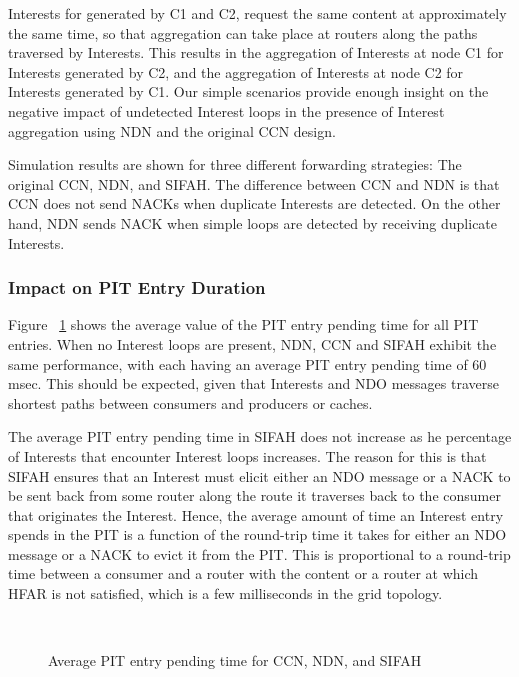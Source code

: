 \documentclass{ancs15-alternate}
\begin{document}
Interests for  generated by C1 and C2, request the same content at approximately the same time, so that aggregation can take place at routers along the paths traversed by Interests. This results in the aggregation of Interests at node C1 for Interests generated by C2, and the aggregation of Interests  at node C2 for Interests generated by C1. Our simple scenarios provide enough insight on the negative impact of undetected Interest loops in the presence of Interest aggregation using NDN and the original CCN design. 

Simulation results are shown for three different forwarding strategies: The original CCN, NDN, and SIFAH. The
difference between CCN and NDN is that CCN  does not send NACKs when duplicate Interests are detected. On the other hand, NDN sends NACK when simple loops are detected by receiving duplicate Interests.



\subsubsection{Impact on PIT Entry Duration}

Figure ~\ref{pending-time} shows the average value of the PIT entry pending time for all PIT entries. When no Interest loops are present,  NDN, CCN and SIFAH 
exhibit the same performance, with each having an average PIT entry pending time of 60 msec.  This should be expected, given that Interests and NDO messages traverse shortest paths between consumers and producers or caches.

The average PIT entry pending time in SIFAH does not increase  as  he percentage of Interests that 
encounter  Interest loops  increases. 
The reason  for this  is that  SIFAH ensures that an  Interest must elicit either an NDO message or a NACK to be sent back from some router along the route it traverses back to the consumer that originates the Interest. Hence, the average amount of time an Interest entry spends in the PIT is a function of the round-trip time it takes for either an NDO message or a NACK to evict it from the PIT. This is proportional to a round-trip time between a consumer and a router with the content or a router  at which HFAR is not satisfied, which is a few milliseconds in the grid topology.

\vspace{-0.1in}
\begin{figure}[h]
\begin{centering}
    \mbox{
      }
\vspace{-0.2in}
   \caption{Average PIT entry pending time for CCN, NDN, and SIFAH}
   \label{pending-time}
\end{centering} 
\end{figure} 
\end{document}
